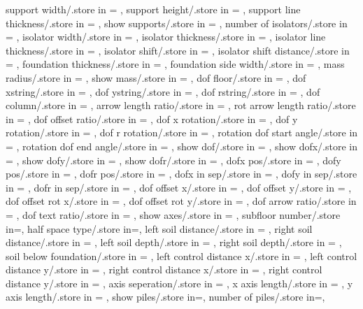 {  support width/.store in = \supportwidth,
  support height/.store in = \supportheight,
  support line thickness/.store in = \baselinet,
  show supports/.store in = \showsupports,
  number of isolators/.store in = \numberofisolators,
  isolator width/.store in = \isolationwidth,
  isolator thickness/.store in = \isolationdepth,
  isolator line thickness/.store in = \isolinet,
  isolator shift/.store in = \isoshiftyn,
  isolator shift distance/.store in = \isoshift,
  foundation thickness/.store in = \foundationdepth,
  foundation side width/.store in = \foundsidew,
  mass radius/.store in = \massrad,
  show mass/.store in = \showmass,
  dof floor/.store in = \doflocfloor,
  dof xstring/.store in = \dofxstr,
  dof ystring/.store in = \dofystr,
  dof rstring/.store in = \dofrstr,
  dof column/.store in = \dofloccolumn,
  arrow length ratio/.store in = \arrowlenratio,
  rot arrow length ratio/.store in = \rotarrowlenratio,
  dof offset ratio/.store in = \dofoffsetratio,
  dof x rotation/.store in = \dofxrotation,
  dof y rotation/.store in = \dofyrotation,
  dof r rotation/.store in = \dofrrotation,
  rotation dof start angle/.store in = \rotdofstartangle,
  rotation dof end angle/.store in = \rotdofendangle,
  show dof/.store in = \showdof,
  show dofx/.store in = \shodofx,
  show dofy/.store in = \shodofy,
  show dofr/.store in = \shodofr,
  dofx pos/.store in = \dofposx,
  dofy pos/.store in = \dofposy,
  dofr pos/.store in = \dofposr,
  dofx in sep/.store in = \dofinnersepx,
  dofy in sep/.store in = \dofinnersepy,
  dofr in sep/.store in = \dofinnersepr,
  dof offset x/.store in = \dofoffsetx,
  dof offset y/.store in = \dofoffsety,
  dof offset rot x/.store in = \dofrotoffsetx,  
  dof offset rot y/.store in = \dofrotoffsety,
  dof arrow ratio/.store in = \dofarrowratio,
  dof text ratio/.store in = \doftextratio,
  show axes/.store in = \showaxes,
  subfloor number/.store in=\subfloors,
  half space type/.store in=\halfspacetype,
  left soil distance/.store in = \leftsoildist,
  right soil distance/.store in = \rightsoildist,
  left soil depth/.store in = \leftsoildepth,
  right soil depth/.store in = \rightsoildepth,
  soil below foundation/.store in = \soilbelowfound,
  left control distance x/.store in = \leftcontrolx,
  left control distance y/.store in = \leftcontroly,
  right control distance x/.store in = \rightcontrolx,
  right control distance y/.store in = \rightcontroly,
  axis seperation/.store in = \axisseperation,
  x axis length/.store in = \axeslenX,
  y axis length/.store in = \axeslenY,
  show piles/.store in=\showpiles,
  number of piles/.store in=\numberofpiles,
}
